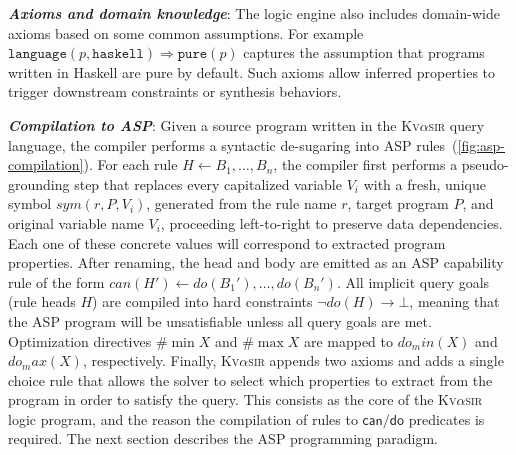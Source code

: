\documentclass[nonacm,sigplan,review]{acmart}
\newcommand{\sys}{{\scshape Kv{$\alpha$}sir}\xspace}
\newcommand{\heading}[1]{\vspace{2pt}\noindent\textbf{\emph{#1}}:\enspace}
\newcommand{\ttt}[1]{\texttt{#1}\xspace}
\begin{document}
\heading{Axioms and domain knowledge}
The logic engine also includes domain-wide axioms based on some common assumptions.
For example
$\ttt{language}(p, \ttt{haskell}) \Rightarrow \ttt{pure}(p)$
captures the assumption that programs written in Haskell are pure by default.
Such axioms allow inferred properties to trigger downstream constraints or synthesis behaviors.

\heading{Compilation to ASP}
Given a source program written in the \sys query language, the compiler
performs a syntactic de-sugaring into ASP rules~(\cref{fig:asp-compilation}).
For each rule $H \leftarrow B_1,\dots,B_n$, the compiler first performs a
pseudo-grounding step that replaces every capitalized variable $V_i$ with a
fresh, unique symbol $\mathit{sym}(r,P,V_i)$, generated from the rule
name $r$, target program $P$, and original variable name $V_i$, proceeding
left-to-right to preserve data dependencies.
Each one of these concrete values will correspond to extracted program properties.
After renaming, the head and body
are emitted as an ASP capability rule of the form $\mathit{can}(H') \leftarrow
\mathit{do}(B_1'),\dots,\mathit{do}(B_n')$. 
All implicit query
goals (rule heads $H$) are compiled into hard constraints $\neg \mathit{do}(H) \rightarrow
\bot$, meaning that the ASP program will be unsatisfiable unless all query goals are met.
Optimization directives $\#\min X$ and $\#\max X$ are mapped to
$\mathit{do_min}(X)$ and $\mathit{do_max}(X)$, respectively.
Finally, \sys
appends two axioms and adds a single choice rule that allows the solver to select which properties to extract from the program in order to satisfy the query.
This consists as the core of the \sys logic program, and the reason the compilation of rules to $\mathsf{can}/\mathsf{do}$ predicates is required.
The next section describes the ASP programming paradigm.
\end{document}

